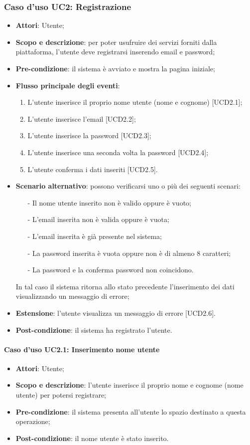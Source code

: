 \newpage
\subsubsection{Caso d'uso UC2: Registrazione}
\begin{itemize}
\item \textbf{Attori}: Utente;
\item \textbf{Scopo e descrizione}: per poter usufruire dei servizi forniti dalla piattaforma, l'utente deve registrarsi inserendo email e password;
\item \textbf{Pre-condizione}: il sistema è avviato e mostra la pagina iniziale;
\item \textbf{Flusso principale degli eventi}:
	\begin{enumerate}
	\item L'utente inserisce il proprio nome utente (nome e cognome) [UCD2.1];
	\item L'utente inserisce l'email [UCD2.2];
	\item L'utente inserisce la password [UCD2.3];
	\item L'utente inserisce una seconda volta la password [UCD2.4];
	\item L'utente conferma i dati inseriti [UCD2.5].
	\end{enumerate}
\item \textbf{Scenario alternativo}: possono verificarsi uno o più dei seguenti scenari:
	\begin{itemize}
	\item[-] Il nome utente inserito non è valido oppure è vuoto;
	\item[-] L'email inserita non è valida oppure è vuota;
	\item[-] L'email inserita è già presente nel sistema;
	\item[-] La password inserita è vuota oppure non è di almeno 8 caratteri;
	\item[-] La password e la conferma password non coincidono.
	\end{itemize}
In tal caso il sistema ritorna allo stato precedente l'inserimento dei dati visualizzando un messaggio di errore;
\item \textbf{Estensione}: l'utente visualizza un messaggio di errore [UCD2.6].
\item \textbf{Post-condizione}: il sistema ha registrato l'utente.
\end{itemize}

\paragraph{Caso d'uso UC2.1: Inserimento nome utente}
\begin{itemize}
\item \textbf{Attori}: Utente;
\item \textbf{Scopo e descrizione}: l'utente inserisce il proprio nome e cognome (nome utente) per potersi registrare;
\item \textbf{Pre-condizione}: il sistema presenta all'utente lo spazio destinato a questa operazione;
\item \textbf{Post-condizione}: il nome utente è stato inserito.
\end{itemize}

